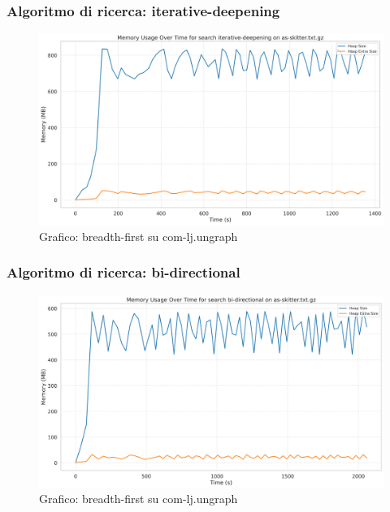 \documentclass{article}
\begin{document}
\subsubsection{Algoritmo di ricerca: iterative-deepening}
\begin{figure}[h]\centering
	\includegraphics[width=\textwidth]{../plots/as-skitter_iterative-deepening.png}
	\caption{Grafico: breadth-first su com-lj.ungraph}
\end{figure}
\subsubsection{Algoritmo di ricerca: bi-directional}
\begin{figure}[h]\centering
	\includegraphics[width=\textwidth]{../plots/as-skitter_bi-directional.png}
	\caption{Grafico: breadth-first su com-lj.ungraph}
\end{figure}
\end{document}
